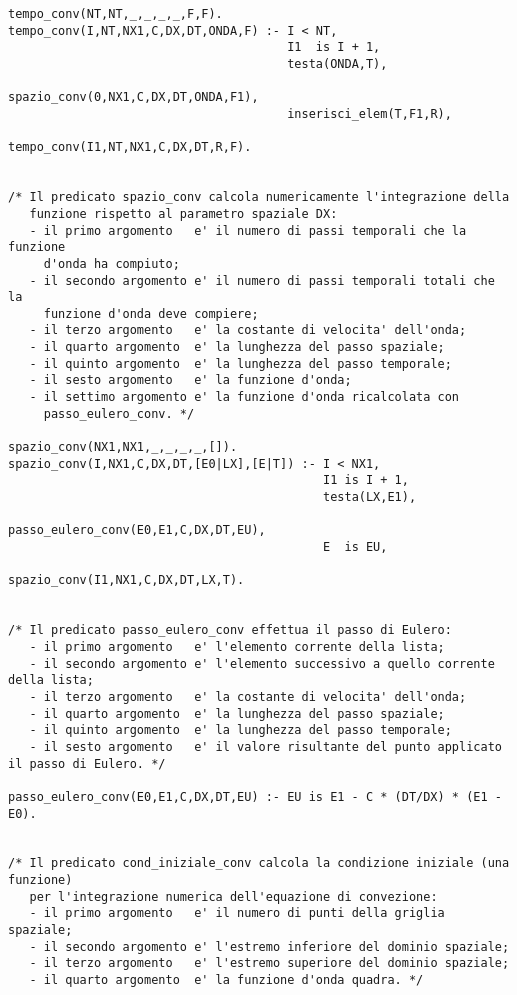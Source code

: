 \begin{verbatim}
tempo_conv(NT,NT,_,_,_,_,F,F).
tempo_conv(I,NT,NX1,C,DX,DT,ONDA,F) :- I < NT,
                                       I1  is I + 1,
                                       testa(ONDA,T),                
                                       spazio_conv(0,NX1,C,DX,DT,ONDA,F1), 
                                       inserisci_elem(T,F1,R),                
                                       tempo_conv(I1,NT,NX1,C,DX,DT,R,F). 


/* Il predicato spazio_conv calcola numericamente l'integrazione della
   funzione rispetto al parametro spaziale DX:
   - il primo argomento   e' il numero di passi temporali che la funzione
     d'onda ha compiuto;
   - il secondo argomento e' il numero di passi temporali totali che la
     funzione d'onda deve compiere; 
   - il terzo argomento   e' la costante di velocita' dell'onda;      
   - il quarto argomento  e' la lunghezza del passo spaziale;
   - il quinto argomento  e' la lunghezza del passo temporale;
   - il sesto argomento   e' la funzione d'onda;
   - il settimo argomento e' la funzione d'onda ricalcolata con 
     passo_eulero_conv. */

spazio_conv(NX1,NX1,_,_,_,_,[]).
spazio_conv(I,NX1,C,DX,DT,[E0|LX],[E|T]) :- I < NX1,
                                            I1 is I + 1,
                                            testa(LX,E1),
                                            passo_eulero_conv(E0,E1,C,DX,DT,EU),
                                            E  is EU,
                                            spazio_conv(I1,NX1,C,DX,DT,LX,T).


/* Il predicato passo_eulero_conv effettua il passo di Eulero:
   - il primo argomento   e' l'elemento corrente della lista;
   - il secondo argomento e' l'elemento successivo a quello corrente della lista;
   - il terzo argomento   e' la costante di velocita' dell'onda;
   - il quarto argomento  e' la lunghezza del passo spaziale;
   - il quinto argomento  e' la lunghezza del passo temporale;
   - il sesto argomento   e' il valore risultante del punto applicato il passo di Eulero. */

passo_eulero_conv(E0,E1,C,DX,DT,EU) :- EU is E1 - C * (DT/DX) * (E1 - E0).


/* Il predicato cond_iniziale_conv calcola la condizione iniziale (una funzione)
   per l'integrazione numerica dell'equazione di convezione:
   - il primo argomento   e' il numero di punti della griglia spaziale;
   - il secondo argomento e' l'estremo inferiore del dominio spaziale;
   - il terzo argomento   e' l'estremo superiore del dominio spaziale; 
   - il quarto argomento  e' la funzione d'onda quadra. */


\end{verbatim}
